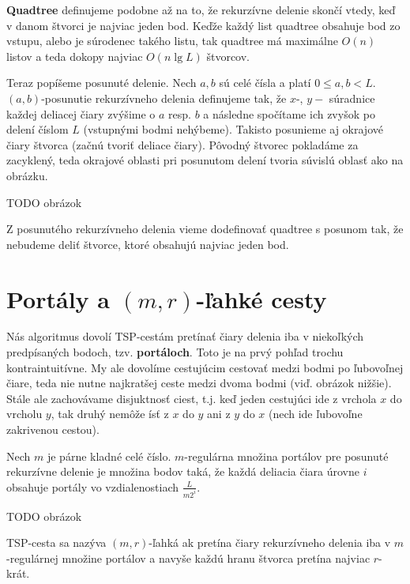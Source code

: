 {\bf Quadtree} definujeme podobne 
až na to, že rekurzívne delenie skončí vtedy, keď v danom štvorci je najviac jeden bod. Keďže každý
list quadtree obsahuje bod zo vstupu, alebo je súrodenec takého listu, tak quadtree má maximálne
$O(n)$ listov a teda dokopy najviac $O(n \lg L)$ štvorcov.

\smallskip

Teraz popíšeme posunuté delenie. Nech $a, b$ sú celé čísla a platí $0 \leq a, b < L$.
$(a,b)$-posunutie rekurzívneho delenia definujeme tak, že $x$-, $y-$ súradnice každej deliacej čiary
zvýšime o $a$ resp. $b$ a následne spočítame ich zvyšok po delení číslom $L$ (vstupnými bodmi
nehýbeme). Takisto posunieme aj okrajové čiary štvorca (začnú tvoriť deliace čiary). Pôvodný štvorec
pokladáme za zacyklený, teda okrajové oblasti pri posunutom delení tvoria súvislú oblasť ako na
obrázku.

TODO obrázok

Z posunutého rekurzívneho delenia vieme dodefinovať quadtree s posunom tak, že nebudeme deliť
štvorce, ktoré obsahujú najviac jeden bod.

\section{Portály a $(m,r)$-ľahké cesty}

Nás algoritmus dovolí TSP-cestám pretínať čiary delenia iba v niekoľkých
predpísaných bodoch, tzv. {\bf portáloch}. Toto je na prvý pohľad trochu kontraintuitívne.
My ale dovolíme cestujúcim cestovať medzi bodmi po ľubovoľnej čiare, teda nie nutne najkratšej
ceste medzi dvoma bodmi (viď. obrázok nižšie). Stále ale zachovávame disjuktnosť ciest, t.j. keď
jeden cestujúci ide z vrchola $x$ do vrcholu $y$, tak druhý nemôže ísť z $x$ do $y$ ani z $y$ do
$x$ (nech ide ľubovoľne zakrivenou cestou). 

\begin{definicia}
Nech $m$ je párne kladné celé číslo. $m$-regulárna množina portálov pre posunuté rekurzívne
delenie je množina bodov taká, že každá deliacia čiara úrovne $i$ obsahuje portály vo
vzdialenostiach $\frac{L}{m2^i}$. 
\end{definicia}

TODO obrázok

\begin{definicia}
TSP-cesta sa nazýva $(m,r)$-ľahká ak pretína čiary rekurzívneho delenia iba v $m$-regulárnej
množine portálov a navyše každú hranu štvorca pretína najviac $r$-krát.
\end{definicia}

